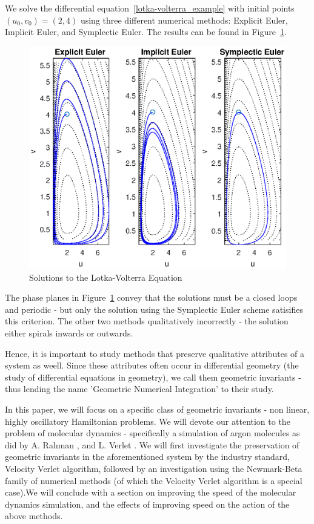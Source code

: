 \documentclass[a4paper, 12pt]{article}
\begin{document}
We solve the differential equation~\ref{lotka-volterra_example} with initial points $(u_0, v_0) = (2, 4)$ using three different numerical methods: Explicit Euler, Implicit Euler, and Symplectic Euler. The results can be found in Figure~\ref{fig:lotka-volterra_solutions}. 
\begin{figure}[H]
\includegraphics[scale=0.80]{lotka-volterra_method_comparison}
\centering
\caption{Solutions to the Lotka-Volterra Equation}
\label{fig:lotka-volterra_solutions}
\end{figure}

The phase planes in Figure~\ref{fig:lotka-volterra_solutions} convey that the solutions must be a closed loops and periodic - but only the solution using the Symplectic Euler scheme satisifies this criterion. The other two methods qualitatively incorrectly - the solution either spirals inwards or outwards.

Hence, it is important to study methods that preserve qualitative attributes of a system as weell. Since these attributes often occur in differential geometry (the study of differential equations in geometry), we call them geometric invariants - thus lending the name 'Geometric Numerical Integration' to their study.

In this paper, we will focus on a specific class of geometric invariants - non linear, highly oscillatory Hamiltonian problems. We will devote our attention to the problem of molecular dynamics - specifically a simulation of argon molecules as did by A. Rahman \cite{Rahman1964}, and L. Verlet \cite{Verlet1967}. We will first investigate the preservation of geometric invariants in the aforementioned system by the industry standard, Velocity Verlet algorithm, followed by an investigation using the Newmark-Beta family of numerical methods (of which the Velocity Verlet algorithm is a special case).We will conclude with a section on improving the speed of the molecular dynamics simulation, and the effects of improving speed on the action of the above methods.
 


\end{document}
